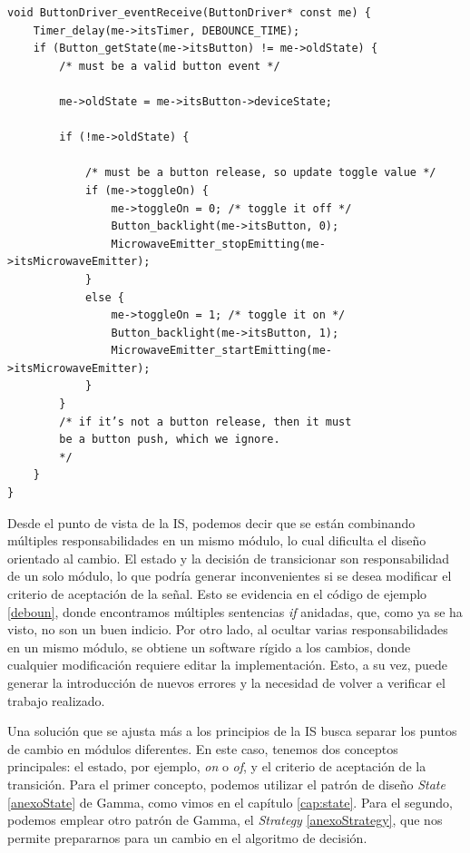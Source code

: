 \begin{lstlisting}[caption=Código ejemplo de una estrategia de deteccion de rebote extraído de \cite{douglass}.,label=deboun]
void ButtonDriver_eventReceive(ButtonDriver* const me) {
    Timer_delay(me->itsTimer, DEBOUNCE_TIME);
    if (Button_getState(me->itsButton) != me->oldState) {
        /* must be a valid button event */
        
        me->oldState = me->itsButton->deviceState;
        
        if (!me->oldState) {
            
            /* must be a button release, so update toggle value */
            if (me->toggleOn) {
                me->toggleOn = 0; /* toggle it off */
                Button_backlight(me->itsButton, 0);
                MicrowaveEmitter_stopEmitting(me->itsMicrowaveEmitter);
            }
            else {
                me->toggleOn = 1; /* toggle it on */
                Button_backlight(me->itsButton, 1);
                MicrowaveEmitter_startEmitting(me->itsMicrowaveEmitter);
            }
        }
        /* if it’s not a button release, then it must
        be a button push, which we ignore.
        */
    }
}
\end{lstlisting}

Desde el punto de vista de la \gls{IS}, podemos decir que se están combinando múltiples responsabilidades en un mismo módulo, lo cual dificulta el diseño orientado al cambio. El estado y la decisión de transicionar son responsabilidad de un solo módulo, lo que podría generar inconvenientes si se desea modificar el criterio de aceptación de la señal. Esto se evidencia en el código de ejemplo \ref{deboun}, donde encontramos múltiples sentencias \textit{if} anidadas, que, como ya se ha visto, no son un buen indicio. Por otro lado, al ocultar varias responsabilidades en un mismo módulo, se obtiene un software rígido a los cambios, donde cualquier modificación requiere editar la implementación. Esto, a su vez, puede generar la introducción de nuevos errores y la necesidad de volver a verificar el trabajo realizado.

Una solución que se ajusta más a los principios de la \gls{IS} busca separar los puntos de cambio en módulos diferentes. En este caso, tenemos dos conceptos principales: el estado, por ejemplo, \textit{on} o \textit{of}, y el criterio de aceptación de la transición. Para el primer concepto, podemos utilizar el patrón de diseño \textit{State} \ref{anexoState} de Gamma, como vimos en el capítulo \ref{cap:state}. Para el segundo, podemos emplear otro patrón de Gamma, el \textit{Strategy} \ref{anexoStrategy}, que nos permite prepararnos para un cambio en el algoritmo de decisión.




